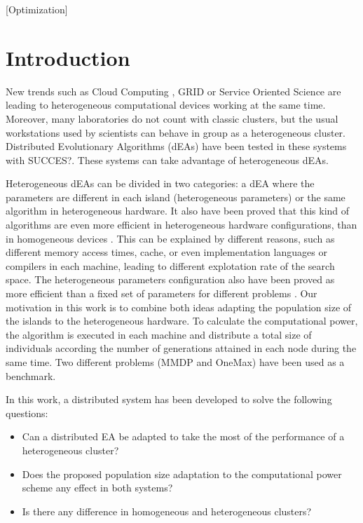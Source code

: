 \documentclass{sig-alternate}
\begin{document}
[Optimization]






%
%
\section{Introduction}
\label{sec:intro}
%
New trends such as Cloud Computing \cite{CLOUD}, GRID \cite{OPENSCIENCEGRID} or Service Oriented Science \cite{GLOBUS} are leading to heterogeneous computational devices working at the same time.  Moreover, many laboratories do not count with classic clusters, but the usual workstations used by scientists can behave in group as a heterogeneous cluster. Distributed Evolutionary Algorithms (dEAs) have been tested in these systems with SUCCES?. These systems can take advantage of heterogeneous dEAs. 

Heterogeneous dEAs can be divided in two categories: a dEA where the parameters are different in each island (heterogeneous parameters) or the same algorithm in heterogeneous hardware. It also have been proved that this kind of algorithms are even more efficient in heterogeneous hardware configurations, than in homogeneous devices \cite{HETEROGENEOUSHARD}. This can be explained by different reasons, such as different memory access times, cache, or even implementation languages or compilers in each machine, leading to different explotation rate of the search space. The heterogeneous parameters configuration also have been proved as more efficient than a fixed set of parameters for different problems \cite{HETEROGENEOUSPARAMETERS}. Our motivation in this work is to combine both ideas adapting the population size of the islands to the heterogeneous hardware. To calculate the computational power, the algorithm is executed in each machine and distribute a total size of individuals according the number of generations attained in each node during the same time. Two different problems (MMDP and OneMax) have been used as a benchmark.


In this work, a distributed system has been developed to solve the following questions:
\begin{itemize}
 \item Can a distributed EA be adapted to take the most of the performance of a heterogeneous cluster?
 \item Does the proposed population size adaptation to the computational power scheme any effect in both systems?
 \item Is there any difference in homogeneous and heterogeneous clusters?
\end{itemize}
\end{document}
